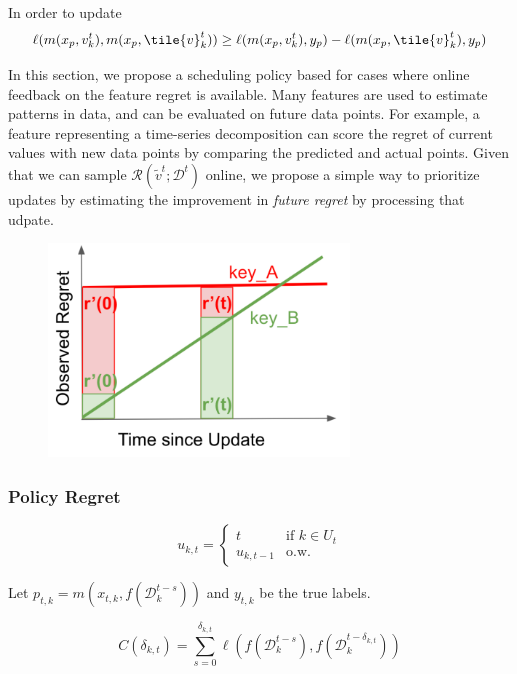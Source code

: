 In order to update 
\begin{equation}
    \ell(m(x_p, v_k^t), m(x_p, \tile{v}_k^t)) \ge \ell(m(x_p, v_k^t), y_p) - \ell(m(x_p, \tile{v}_k^t), y_p)
\end{equation}


In this section, we propose a scheduling policy based for cases where online feedback on the feature regret is available. Many features are used to estimate patterns in data, and can be evaluated on future data points. For example, a feature representing a time-series decomposition can score the regret of current values with new data points by comparing the predicted and actual points.  
Given that we can sample $\mathcal{R}(\tilde{v}^t; \mathcal{D}^t)$ online, we propose a simple way to prioritize updates by estimating the improvement in \textit{future regret} by processing that udpate.  

\begin{figure}[t]
\centering
\includegraphics[width=8cm]{ralf/figures/r_tmp.pdf}
\setlength{\belowcaptionskip}{-10pt}
\setlength{\abovecaptionskip}{10pt}
\caption{}
\label{f:overview}
\end{figure}

\subsubsection{Policy Regret}

\begin{equation*}
u_{k,t} = \begin{cases}
t &\text{if $k \in U_t$}\\
u_{k,t-1} &\text{o.w.}
\end{cases}
\end{equation*}

Let $p_{t,k} = m(x_{t,k}, f(\mathcal{D}_k^{t-s}))$ and $y_{t,k}$ be the true labels. 

\begin{equation}
    C(\delta_{k,t}) = \sum_{s=0}^{\delta_{k, t}} \ell(f(\mathcal{D}_k^{t-s}), f(\mathcal{D}_k^{t-\delta_{k,t}}))
\end{equation}

